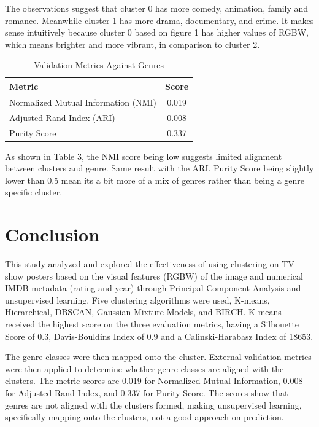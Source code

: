 \documentclass[conference]{IEEEtran}
\begin{document}
The observations suggest that cluster 0 has more comedy, animation, family and romance. Meanwhile cluster 1 has more drama, documentary, and crime. It makes sense intuitively because cluster 0 based on figure 1 has higher values of RGBW, which means brighter and more vibrant, in comparison to cluster 2. 

\begin{table}[h]
    \renewcommand{\arraystretch}{1.2}
    \centering
    \caption{Validation Metrics Against Genres}
    \label{tab:validation}
    \begin{tabular}{lc}
        \hline
        \textbf{Metric} & \textbf{Score} \\
        \hline
        Normalized Mutual Information (NMI) & 0.019 \\
        Adjusted Rand Index (ARI) & 0.008 \\
        Purity Score & 0.337 \\
        \hline
    \end{tabular}
\end{table}


As shown in Table 3, the NMI score being low suggests limited alignment between clusters and genre. Same result with the ARI. Purity Score being slightly lower than 0.5 mean its a bit more of a mix of genres rather than being a genre specific cluster.


\section{Conclusion}

This study analyzed and explored the effectiveness of using clustering on TV show posters based on the visual features (RGBW) of the image and numerical IMDB metadata (rating and year) through Principal Component Analysis and unsupervised learning. Five clustering algorithms were used, K-means, Hierarchical, DBSCAN, Gaussian Mixture Models, and BIRCH. K-means received the highest score on the three evaluation metrics, having a Silhouette Score of 0.3, Davis-Bouldins Index of 0.9 and a Calinski-Harabasz Index of 18653. 

The genre classes were then mapped onto the cluster. External validation metrics were then applied to determine whether genre classes are aligned with the clusters. The metric scores are 0.019 for Normalized Mutual Information, 0.008 for Adjusted Rand Index, and 0.337 for Purity Score. The scores show that genres are not aligned with the clusters formed, making unsupervised learning, specifically mapping onto the clusters, not a good approach on prediction. 
\end{document}
